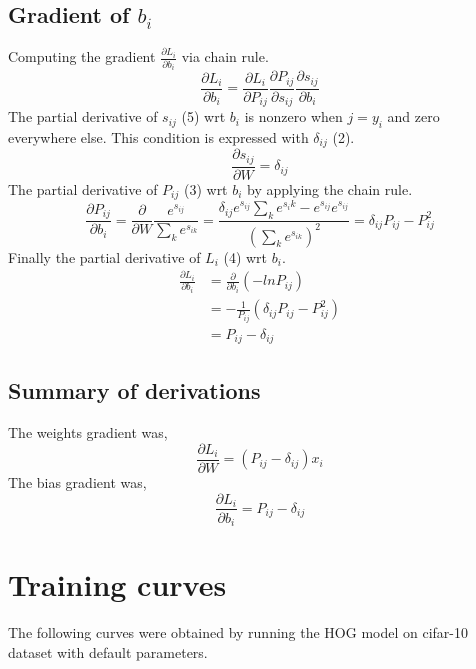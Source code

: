 \documentclass[12pt, letter]{article}
\begin{document}
\subsection{Gradient of $b_i$}
Computing the gradient $\frac{\partial L_i}{\partial b_i}$ via chain rule.
\begin{equation}\nonumber
  \frac{\partial L_i}{\partial b_i} =
  \frac{\partial L_i}{\partial P_{ij}} \frac{\partial P_{ij}}{\partial s_{ij}} \frac{\partial s_{ij}}{\partial b_i}
\end{equation}
The partial derivative of $s_{ij}$ (5) wrt $b_i$ is nonzero when $j=y_i$
and zero everywhere else. This condition is expressed with $\delta_{ij}$ (2).
\begin{equation}\nonumber
  \frac{\partial s_{ij}}{\partial W} = \delta_{ij}
\end{equation}
The partial derivative of $P_{ij}$ (3) wrt $b_i$ by applying the chain rule.
\begin{equation}\nonumber
  \frac{\partial P_{ij}}{\partial b_i} = \frac{\partial}{\partial W}\frac{e^{s_{ij}}}{\sum_ke^{s_{ik}}} = \frac{\delta_{ij} e^{s_{ij}} \sum_ke^{s_ik}-e^{s_{ij}}e^{s_{ij}}}{\left(\sum_ke^{s_{ik}}\right)^2} = \delta_{ij}P_{ij}-P_{ij}^2
\end{equation}
Finally the partial derivative of $L_i$ (4) wrt $b_i$.
\begin{equation}
\begin{split}
  \frac{\partial L_i}{\partial b_i}& = \frac{\partial}{\partial b_i}\left(-lnP_{ij}\right)\\
  & = -\frac{1}{P_{ij}} (\delta_{ij}P_{ij}-P_{ij}^2) \\
  & = P_{ij} - \delta_{ij}
\end{split}
\end{equation}

\subsection{Summary of derivations}
The weights gradient was,
\begin{equation}\nonumber\frac{\partial L_i}{\partial W} = (P_{ij} -
  \delta_{ij}) x_i \end{equation}
The bias gradient was,
\begin{equation}\nonumber\frac{\partial L_i}{\partial b_i} = P_{ij} - \delta_{ij}\end{equation}

\pagebreak

\section{Training curves}
The following curves were obtained by running the HOG model on cifar-10 dataset
with default parameters.
\end{document}
